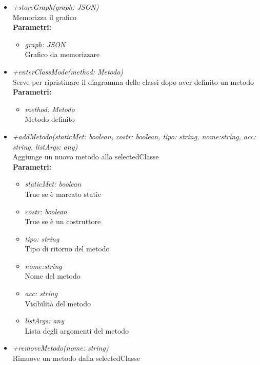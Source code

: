 \begin{itemize}
\begin{itemize}
\begin{itemize}
    		\end{itemize}
    		\item \emph{+storeGraph(graph: JSON)}\\
    		Memorizza il grafico\\
    		\textbf{Parametri:}
    		\begin{itemize}
    			\item \emph{graph: JSON}\\
    			Grafico da memorizzare
    		\end{itemize}
    		\item \emph{+enterClassMode(method: Metodo)}\\
    		Serve per ripristinare il diagramma delle classi dopo aver definito un metodo\\
    		\textbf{Parametri:}
    		\begin{itemize}
    			\item \emph{method: Metodo}\\
    			Metodo definito
    		\end{itemize}
    		\item \emph{+addMetodo(staticMet: boolean, costr: boolean, tipo: string, nome:string, acc: string, listArgs: any)}\\
    		Aggiunge un nuovo metodo alla selectedClasse\\
    		\textbf{Parametri:}
    		\begin{itemize}
    			\item \emph{staticMet: boolean}\\
    			True se è marcato static
    			\item \emph{costr: boolean}\\
    			True se è un costruttore
    			\item \emph{tipo: string}\\
    			Tipo di ritorno del metodo
    			\item \emph{nome:string}\\
    			Nome del metodo
    			\item \emph{acc: string}\\
    			Visibilità del metodo
    			\item \emph{listArgs: any}\\
    			Lista degli argomenti del metodo
    		\end{itemize}
    		\item \emph{+removeMetodo(nome: string)}\\
    		Rimuove un metodo dalla selectedClasse\\

\end{itemize}
\end{itemize}
